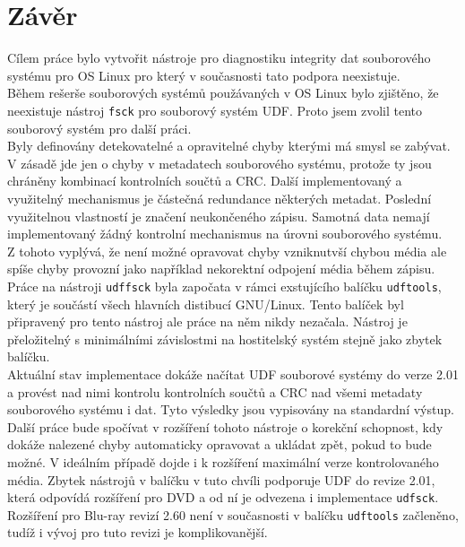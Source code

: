 \chapter{Závěr}
Cílem práce bylo vytvořit nástroje pro diagnostiku integrity dat souborového systému pro OS Linux pro který v současnosti tato podpora neexistuje.\\
Během rešerše souborových systémů použávaných v OS Linux bylo zjištěno, že neexistuje nástroj \texttt{fsck} pro souborový systém UDF. Proto jsem zvolil tento souborový systém pro další práci.\\
Byly definovány detekovatelné a opravitelné chyby kterými má smysl se zabývat. V zásadě jde jen o chyby v metadatech souborového systému, protože ty jsou chráněny kombinací kontrolních součtů a CRC. Další implementovaný a využitelný mechanismus je částečná redundance některých metadat. Poslední využitelnou vlastností je značení neukončeného zápisu. Samotná data nemají implementovaný žádný kontrolní mechanismus na úrovni souborového systému.\\
Z tohoto vyplývá, že není možné opravovat chyby vzniknutvší chybou média ale spíše chyby provozní jako například nekorektní odpojení média během zápisu.\\
Práce na nástroji \texttt{udffsck} byla započata v rámci exstujícího balíčku \texttt{udftools}, který je součástí všech hlavních distibucí GNU/Linux. Tento balíček byl připravený pro tento nástroj ale práce na něm nikdy nezačala. Nástroj je přeložitelný s minimálními závislostmi na hostitelský systém stejně jako zbytek balíčku.\\
Aktuální stav implementace dokáže načítat UDF souborové systémy do verze 2.01 a provést nad nimi kontrolu kontrolních součtů a CRC nad všemi metadaty souborového systému i dat. Tyto výsledky jsou vypisovány na standardní výstup.\\
Další práce bude spočívat v rozšíření tohoto nástroje o korekční schopnost, kdy dokáže nalezené chyby automaticky opravovat a ukládat zpět, pokud to bude možné. V ideálním případě dojde i k rozšíření maximální verze kontrolovaného média. Zbytek nástrojů v balíčku v tuto chvíli podporuje UDF do revize 2.01, která odpovídá rozšíření pro DVD a od ní je odvezena i implementace \texttt{udfsck}. Rozšíření pro Blu-ray revizí 2.60 není v současnosti v balíčku \texttt{udftools} začleněno, tudíž i vývoj pro tuto revizi je komplikovanější. 
